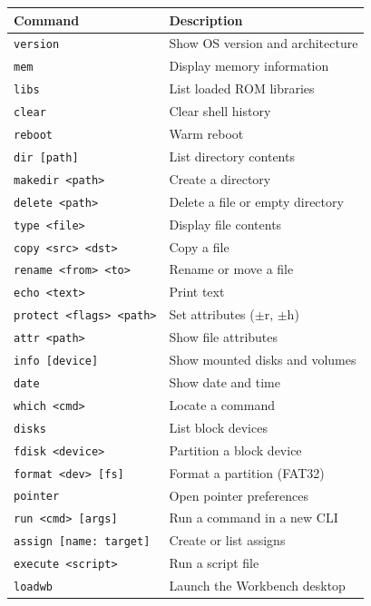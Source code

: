 \documentclass[11pt,a4paper]{report}
\begin{document}
\begin{table}[h]
    \centering
    \begin{tabular}{ll}
        \toprule
        \textbf{Command} & \textbf{Description} \\
        \midrule
        \texttt{version} & Show OS version and architecture \\
        \texttt{mem} & Display memory information \\
        \texttt{libs} & List loaded ROM libraries \\
        \texttt{clear} & Clear shell history \\
        \texttt{reboot} & Warm reboot \\
        \texttt{dir [path]} & List directory contents \\
        \texttt{makedir <path>} & Create a directory \\
        \texttt{delete <path>} & Delete a file or empty directory \\
        \texttt{type <file>} & Display file contents \\
        \texttt{copy <src> <dst>} & Copy a file \\
        \texttt{rename <from> <to>} & Rename or move a file \\
        \texttt{echo <text>} & Print text \\
        \texttt{protect <flags> <path>} & Set attributes ($\pm$r, $\pm$h) \\
        \texttt{attr <path>} & Show file attributes \\
        \texttt{info [device]} & Show mounted disks and volumes \\
        \texttt{date} & Show date and time \\
        \texttt{which <cmd>} & Locate a command \\
        \texttt{disks} & List block devices \\
        \texttt{fdisk <device>} & Partition a block device \\
        \texttt{format <dev> [fs]} & Format a partition (FAT32) \\
        \texttt{pointer} & Open pointer preferences \\
        \texttt{run <cmd> [args]} & Run a command in a new CLI \\
        \texttt{assign [name: target]} & Create or list assigns \\
        \texttt{execute <script>} & Run a script file \\
        \texttt{loadwb} & Launch the Workbench desktop \\

\end{tabular}
\end{table}
\end{document}
